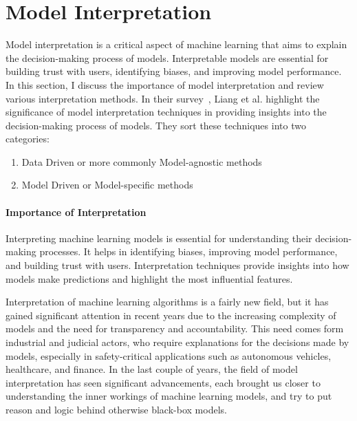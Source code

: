 
\section{Model Interpretation}\label{sec:model-interpretation}

Model interpretation is a critical aspect of machine learning that aims to explain the decision-making process of models.
Interpretable models are essential for building trust with users, identifying biases, and improving model performance.
In this section, I discuss the importance of model interpretation and review various interpretation methods.
In their survey~\cite{LIANG2021168}, Liang et al. highlight the significance of model interpretation techniques
in providing insights into the decision-making process of models.
They sort these techniques into two categories:
\begin{enumerate}
    \item Data Driven or more commonly Model-agnostic methods
    \item Model Driven or Model-specific methods
\end{enumerate}

\paragraph{Importance of Interpretation}\label{par:importance-of-interpretation}

Interpreting machine learning models is essential for understanding their decision-making processes.
It helps in identifying biases, improving model performance, and building trust with users.
Interpretation techniques provide insights into how models make predictions and highlight
the most influential features.

Interpretation of machine learning algorithms is a fairly new field, but it has gained significant attention
in recent years due to the increasing complexity of models and the need for transparency and accountability.
This need comes form industrial and judicial actors, who require explanations for the decisions made by models,
especially in safety-critical applications such as autonomous vehicles, healthcare, and finance.
In the last couple of years, the field of model interpretation has seen significant advancements, each brought
us closer to understanding the inner workings of machine learning models, and try to put reason and logic behind
otherwise black-box models.

